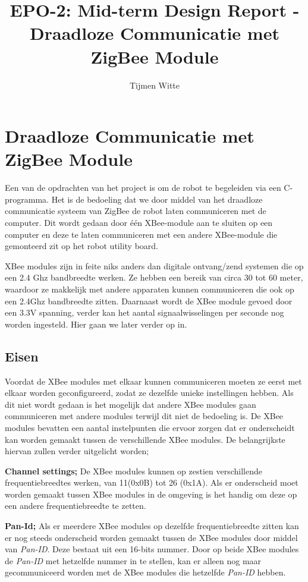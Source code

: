 \documentclass{report}
\title{EPO-2: Mid-term Design Report - Draadloze Communicatie met ZigBee Module}
\author{Tijmen Witte}
\begin{document}
\chapter{Draadloze Communicatie met ZigBee Module}

Een van de opdrachten van het project is om de robot te begeleiden via een C-programma. Het is de bedoeling dat we door middel van het draadloze communicatie systeem van ZigBee de robot laten communiceren met de computer. Dit wordt gedaan door één XBee-module aan te sluiten op een computer en deze te laten communiceren met een andere XBee-module die  gemonteerd zit op het robot utility board.
\newline

\noindent XBee modules zijn in feite niks anders dan digitale ontvang/zend systemen die op een 2.4 Ghz bandbreedte werken. Ze hebben een bereik van circa 30 tot 60 meter, waardoor ze makkelijk met andere apparaten kunnen communiceren die ook op een 2.4Ghz bandbreedte zitten. Daarnaast wordt de XBee module gevoed door een 3.3V spanning, verder kan het aantal signaalwisselingen per seconde nog worden ingesteld. Hier gaan we later  verder op in.
\newline

\section{Eisen}

Voordat de XBee modules met elkaar kunnen communiceren moeten ze eerst met elkaar worden geconfigureerd, zodat ze dezelfde unieke instellingen hebben. Als dit niet wordt gedaan is het mogelijk dat andere XBee modules gaan communiceren met andere modules terwijl dit niet de bedoeling is.
\newline
De XBee modules bevatten een aantal instelpunten die ervoor zorgen dat er onderscheidt kan worden gemaakt tussen de verschillende XBee modules. De belangrijkste hiervan zullen verder uitgelicht worden;
\newline

\textbf{Channel settings;}
\newline
De XBee modules kunnen op zestien verschillende frequentiebreedtes werken, van 11(0x0B) tot 26 (0x1A). Als er onderscheid moet worden gemaakt tussen XBee modules in de omgeving is het handig om deze op een andere frequentiebreedte te zetten.
\newline

\textbf{Pan-Id;}
\newline
Als er meerdere XBee modules op dezelfde frequentiebreedte zitten kan er nog steeds onderscheid worden gemaakt tussen de XBee modules door middel van \textit{Pan-ID}. Deze bestaat uit een 16-bits nummer. Door op beide XBee modules de \textit{Pan-ID}  met hetzelfde nummer in te stellen, kan er alleen nog maar gecommuniceerd worden met de XBee modules die hetzelfde \textit{Pan-ID} hebben.
\newline
\end{document}
